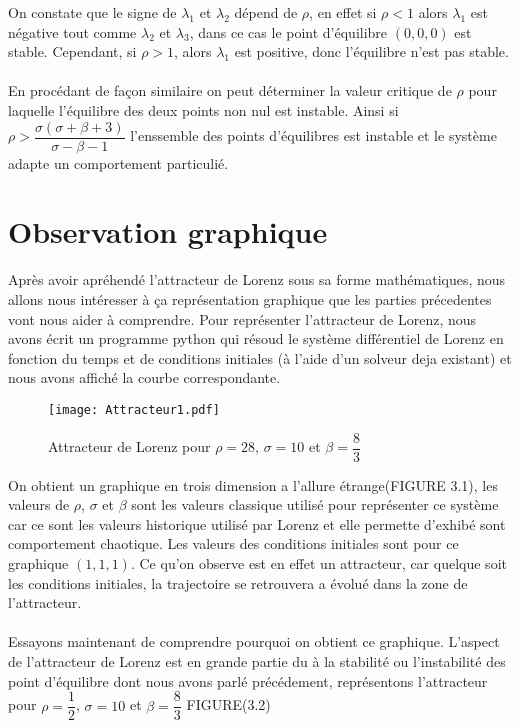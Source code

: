  On constate que le signe de  $\lambda_{1}$ et $\lambda_{2}$ dépend de $\rho$, en effet si $\rho<1$ alors $\lambda_{1}$ est négative tout comme $\lambda_{2}$ et $\lambda_{3}$, dans ce cas le point d'équilibre $(0,0,0)$ est stable. Cependant, si $\rho>1$, alors $\lambda_{1}$ est positive, donc l'équilibre n'est pas stable.\\\\
 En procédant de façon similaire on peut déterminer la valeur critique de $\rho$ pour laquelle l'équilibre des deux points non nul est instable. Ainsi si $\rho > \dfrac{\sigma(\sigma+\beta+3)}{\sigma-\beta-1}$ l'enssemble des points d'équilibres est instable et le système adapte un comportement particulié.

 \section{Observation graphique}
Après avoir apréhendé l'attracteur de Lorenz sous sa forme mathématiques, nous allons nous intéresser à ça représentation graphique que les parties précedentes vont nous aider à comprendre. Pour représenter l'attracteur de Lorenz, nous avons écrit un programme python qui résoud le système différentiel de Lorenz en fonction du temps et de conditions initiales (à l'aide d'un solveur deja existant) et nous avons affiché la courbe correspondante.\\

\begin{figure}
        \texttt{[image: Attracteur1.pdf]}
        \caption{Attracteur de Lorenz pour $\rho=28$, $\sigma=10$ et $\beta=\dfrac{8}{3}$} 
\end{figure} 

On obtient un graphique en trois dimension a l'allure étrange(FIGURE 3.1), les valeurs de $\rho$, $\sigma$ et $\beta$ sont les valeurs classique utilisé pour représenter ce système car ce sont les valeurs historique utilisé par Lorenz et elle permette d'exhibé sont comportement chaotique. Les valeurs des conditions initiales sont pour ce graphique $(1,1,1)$. Ce qu'on observe est en effet un attracteur, car quelque soit les conditions initiales, la trajectoire se retrouvera a évolué dans la zone de l'attracteur.\\\\
Essayons maintenant de comprendre pourquoi on obtient ce graphique. L'aspect de l'attracteur de Lorenz est en grande partie du à la stabilité ou l'instabilité des point d'équilibre dont nous avons parlé précédement, représentons l'attracteur pour $\rho=\dfrac{1}{2}$, $\sigma=10$ et $\beta=\dfrac{8}{3}$ FIGURE(3.2) 

